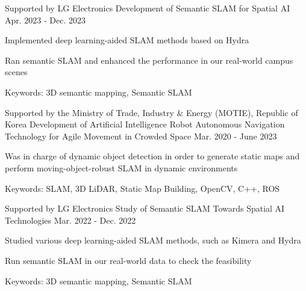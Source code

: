 \begin{cventries}
  \cventry
    {Supported by LG Electronics} %
    {Development of Semantic SLAM for Spatial AI} %
    {\urban} %
    {Apr. 2023 - Dec. 2023} %
    {
      \begin{cvitems} %
        \item Implemented deep learning-aided SLAM methods based on Hydra
        \item Ran semantic SLAM and enhanced the performance in our real-world campus scenes
        \item Keywords: 3D semantic mapping, Semantic SLAM
      \end{cvitems}
    }

  \cventry
    {Supported by the Ministry of Trade, Industry \& Energy (MOTIE), Republic of Korea} %
    {Development of Artificial Intelligence Robot Autonomous Navigation Technology for Agile Movement in Crowded Space} %
    {\urban} %
    {Mar. 2020 - June 2023} %
    {
      \begin{cvitems} %
        \item Was in charge of dynamic object detection in order to generate static maps and perform moving-object-robust SLAM in dynamic environments
        \item Keywords: SLAM, 3D LiDAR, Static Map Building, OpenCV, C++, ROS
      \end{cvitems}
    }

  \cventry
    {Supported by LG Electronics} %
    {Study of Semantic SLAM Towards Spatial AI Technologies} %
    {\urban} %
    {Mar. 2022 - Dec. 2022} %
    {
      \begin{cvitems} %
        \item Studied various deep learning-aided SLAM methods, such as Kimera and Hydra
        \item Run semantic SLAM in our real-world data to check the feasibility
        \item Keywords: 3D semantic mapping, Semantic SLAM
      \end{cvitems}
    }


\end{cventries}
